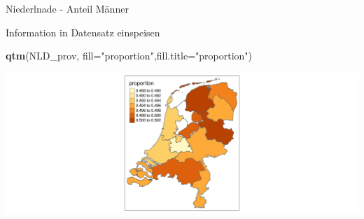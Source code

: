 \documentclass[ignorenonframetext,]{beamer}
\newenvironment{Shaded}{\begin{snugshade}}{\end{snugshade}}
\newcommand{\KeywordTok}[1]{\textcolor[rgb]{0.13,0.29,0.53}{\textbf{#1}}}
\newcommand{\DataTypeTok}[1]{\textcolor[rgb]{0.13,0.29,0.53}{#1}}
\newcommand{\StringTok}[1]{\textcolor[rgb]{0.31,0.60,0.02}{#1}}
\newcommand{\OperatorTok}[1]{\textcolor[rgb]{0.81,0.36,0.00}{\textbf{#1}}}
\newcommand{\NormalTok}[1]{#1}
\begin{document}
\begin{frame}[fragile]{Niederlnade - Anteil Männer}

Information in Datensatz einspeisen

\begin{Shaded}
\end{Shaded}

\begin{Shaded}
\begin{Highlighting}[]
\KeywordTok{qtm}\NormalTok{(NLD_prov, }\DataTypeTok{fill=}\StringTok{"proportion"}\NormalTok{,}\DataTypeTok{fill.title=}\StringTok{"proportion"}\NormalTok{) }
\end{Highlighting}
\end{Shaded}

\includegraphics{tmap_files/figure-beamer/unnamed-chunk-33-1.pdf}

\end{frame}
\end{document}

